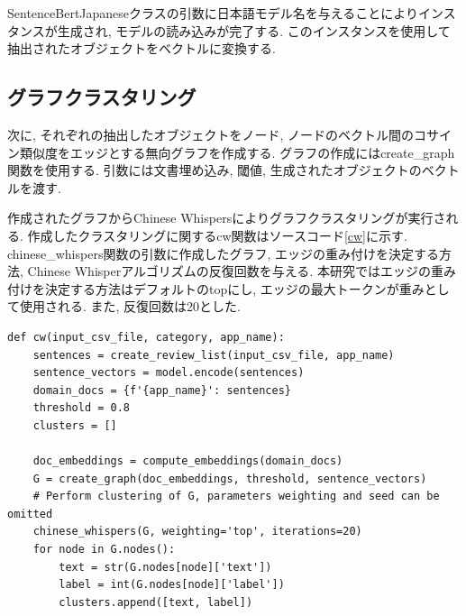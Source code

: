 


SentenceBertJapaneseクラスの引数に日本語モデル名を与えることによりインスタンスが生成され, モデルの読み込みが完了する. このインスタンスを使用して抽出されたオブジェクトをベクトルに変換する. 


\subsection{グラフクラスタリング}
次に, それぞれの抽出したオブジェクトをノード, ノードのベクトル間のコサイン類似度をエッジとする無向グラフを作成する. グラフの作成にはcreate\_graph関数を使用する. 引数には文書埋め込み, 閾値, 生成されたオブジェクトのベクトルを渡す. 

作成されたグラフからChinese Whispersによりグラフクラスタリングが実行される. 作成したクラスタリングに関するcw関数はソースコード\ref{cw}に示す. chinese\_whispers関数の引数に作成したグラフ, エッジの重み付けを決定する方法, Chinese Whisperアルゴリズムの反復回数を与える. 本研究ではエッジの重み付けを決定する方法はデフォルトのtopにし, エッジの最大トークンが重みとして使用される. また, 反復回数は20とした. 

\begin{lstlisting}[caption=clustering.py,label=cw]
  def cw(input_csv_file, category, app_name):
    sentences = create_review_list(input_csv_file, app_name)
    sentence_vectors = model.encode(sentences)
    domain_docs = {f'{app_name}': sentences}
    threshold = 0.8
    clusters = []
    
    doc_embeddings = compute_embeddings(domain_docs)
    G = create_graph(doc_embeddings, threshold, sentence_vectors)
    # Perform clustering of G, parameters weighting and seed can be omitted
    chinese_whispers(G, weighting='top', iterations=20)
    for node in G.nodes():
        text = str(G.nodes[node]['text'])
        label = int(G.nodes[node]['label'])
        clusters.append([text, label])
\end{lstlisting}

